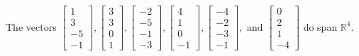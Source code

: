\begin{exercise}
\begin{exerciseStatement}
  \end{exerciseStatement}
  \begin{exerciseAnswer}
   The vectors \(\left[\begin{array}{r}
1 \\
3 \\
-5 \\
-1
\end{array}\right] , \left[\begin{array}{r}
3 \\
3 \\
0 \\
1
\end{array}\right] , \left[\begin{array}{r}
-2 \\
-5 \\
-1 \\
-3
\end{array}\right] , \left[\begin{array}{r}
4 \\
1 \\
0 \\
-1
\end{array}\right] , \left[\begin{array}{r}
-4 \\
-2 \\
-3 \\
-1
\end{array}\right] , \text{ and } \left[\begin{array}{r}
0 \\
2 \\
1 \\
-4
\end{array}\right]\) 
  	 do  
	span \(\mathbb{R}^4\).
  


  \end{exerciseAnswer}
\end{exercise}